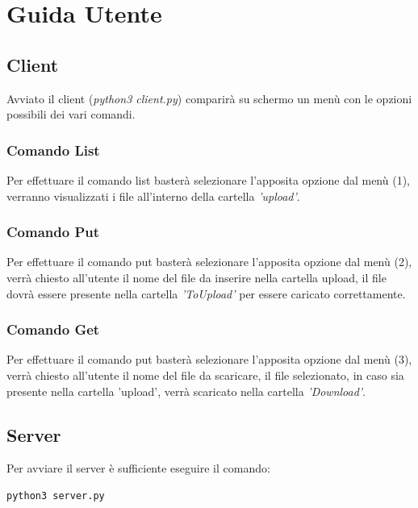 \documentclass{article}
\begin{document}
\newpage
\section{Guida Utente}
\subsection{Client}
Avviato il client (\textit{python3 client.py}) comparirà su schermo un menù con le opzioni possibili dei vari comandi.
\subsubsection{Comando List}Per effettuare il comando list basterà selezionare l'apposita opzione dal menù (1), verranno visualizzati i file all'interno della cartella \textit{'upload'}.
\subsubsection{Comando Put}Per effettuare il comando put basterà selezionare l'apposita opzione dal menù (2), verrà chiesto all'utente il nome del file da inserire nella cartella upload, il file dovrà essere presente nella cartella \textit{'ToUpload'} per essere caricato correttamente.
\subsubsection{Comando Get}Per effettuare il comando put basterà selezionare l'apposita opzione dal menù (3), verrà chiesto all'utente il nome del file da scaricare, il file selezionato, in caso sia presente nella cartella 'upload', verrà scaricato nella cartella \textit{'Download'}.
\subsection{Server}


Per avviare il server è sufficiente eseguire il comando:

\begin{verbatim}
python3 server.py
\end{verbatim}
\end{document}
